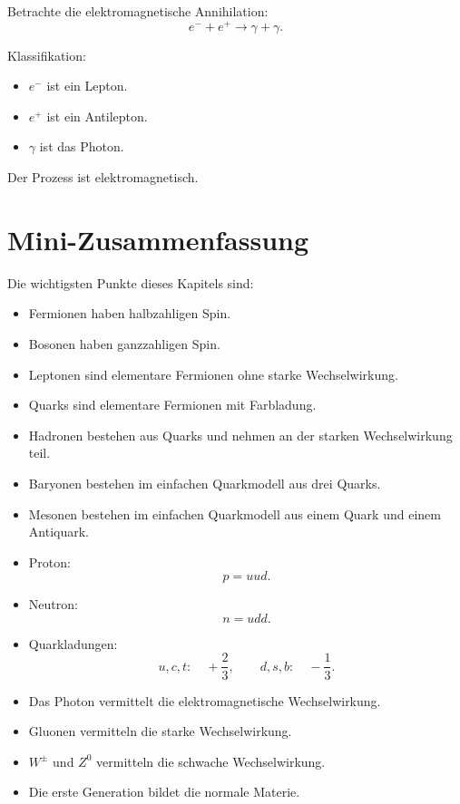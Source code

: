 \begin{examplebox}
Betrachte die elektromagnetische Annihilation:
\[
    e^- + e^+ \rightarrow \gamma + \gamma.
\]

Klassifikation:
\begin{itemize}
    \item $e^-$ ist ein Lepton.
    \item $e^+$ ist ein Antilepton.
    \item $\gamma$ ist das Photon.
\end{itemize}

Der Prozess ist elektromagnetisch.
\end{examplebox}

\section{Mini-Zusammenfassung}

\begin{notebox}
Die wichtigsten Punkte dieses Kapitels sind:
\begin{itemize}
    \item Fermionen haben halbzahligen Spin.
    \item Bosonen haben ganzzahligen Spin.
    \item Leptonen sind elementare Fermionen ohne starke Wechselwirkung.
    \item Quarks sind elementare Fermionen mit Farbladung.
    \item Hadronen bestehen aus Quarks und nehmen an der starken Wechselwirkung teil.
    \item Baryonen bestehen im einfachen Quarkmodell aus drei Quarks.
    \item Mesonen bestehen im einfachen Quarkmodell aus einem Quark und einem Antiquark.
    \item Proton:
    \[
        p=uud.
    \]
    \item Neutron:
    \[
        n=udd.
    \]
    \item Quarkladungen:
    \[
        u,c,t:\quad +\frac{2}{3},
        \qquad
        d,s,b:\quad -\frac{1}{3}.
    \]
    \item Das Photon vermittelt die elektromagnetische Wechselwirkung.
    \item Gluonen vermitteln die starke Wechselwirkung.
    \item $W^\pm$ und $Z^0$ vermitteln die schwache Wechselwirkung.
    \item Die erste Generation bildet die normale Materie.
\end{itemize}
\end{notebox}


